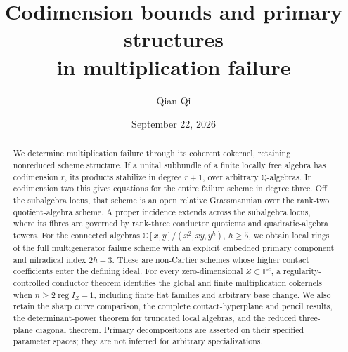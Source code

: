 \documentclass[11pt,reqno]{amsart}
\title[Codimension and multiplication failure]{Codimension bounds and primary structures\\in multiplication failure}
\author{Qian Qi}
\date{September 22, 2026}
\numberwithin{equation}{section}
\theoremstyle{definition}\newtheorem{definition}[theorem]{Definition}
\theoremstyle{remark}\newtheorem{remark}[theorem]{Remark}
\newcommand{\C}{\mathbb C}
\begin{document}
\begin{abstract}
We determine multiplication failure through its coherent cokernel, retaining nonreduced scheme structure. If a unital subbundle of a finite locally free algebra has codimension $r$, its products stabilize in degree $r+1$, over arbitrary $\mathbb Q$-algebras. In codimension two this gives equations for the entire failure scheme in degree three. Off the subalgebra locus, that scheme is an open relative Grassmannian over the rank-two quotient-algebra scheme. A proper incidence extends across the subalgebra locus, where its fibres are governed by rank-three conductor quotients and quadratic-algebra towers. For the connected algebras $\C[x,y]/(x^2,xy,y^h)$, $h\ge5$, we obtain local rings of the full multigenerator failure scheme with an explicit embedded primary component and nilradical index $2h-3$. These are non-Cartier schemes whose higher contact coefficients enter the defining ideal. For every zero-dimensional $Z\subset\mathbb P^e$, a regularity-controlled conductor theorem identifies the global and finite multiplication cokernels when $n\ge2\operatorname{reg}I_Z-1$, including finite flat families and arbitrary base change. We also retain the sharp curve comparison, the complete contact-hyperplane and pencil results, the determinant-power theorem for truncated local algebras, and the reduced three-plane diagonal theorem. Primary decompositions are asserted on their specified parameter spaces; they are not inferred for arbitrary specializations.
\end{abstract}
\maketitle
















\end{document}
